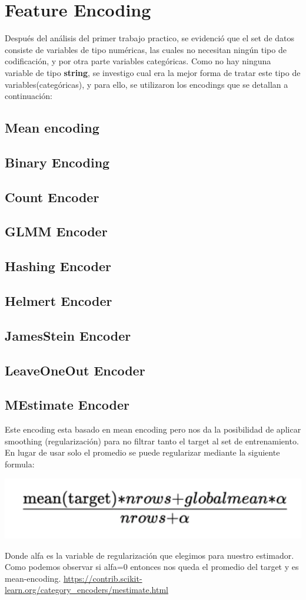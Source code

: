 \documentclass[12pt,a4paper]{article}
\begin{document}
\section{Feature Encoding}
Después del análisis del primer trabajo practico, se evidenció que el set de datos consiste de variables de tipo numéricas, las cuales no necesitan ningún tipo de codificación, y por otra parte variables categóricas. Como no hay ninguna variable de tipo \textbf{string}, se investigo cual era la mejor forma de tratar este tipo de variables(categóricas), y para ello, se utilizaron los encodings que se detallan a continuación:

\subsection{Mean encoding}
\subsection{Binary Encoding}
\subsection{Count Encoder}
\subsection{GLMM Encoder}
\subsection{Hashing Encoder}
\subsection{Helmert Encoder}
\subsection{JamesStein Encoder}
\subsection{LeaveOneOut Encoder}
\subsection{MEstimate Encoder}
Este encoding esta basado en mean encoding pero nos da la posibilidad de aplicar smoothing (regularización) para no filtrar tanto el target al set de entrenamiento. En lugar de usar solo el promedio se puede regularizar mediante la siguiente formula:
\begin{center}
    \includegraphics[scale=0.5]{imgs/formula-smoothing.png}
\end{center}
Donde alfa es la variable de regularización que elegimos para nuestro estimador. Como podemos observar si alfa=0 entonces nos queda el promedio del target y es mean-encoding.
\url{https://contrib.scikit-learn.org/category_encoders/mestimate.html}
\end{document}
